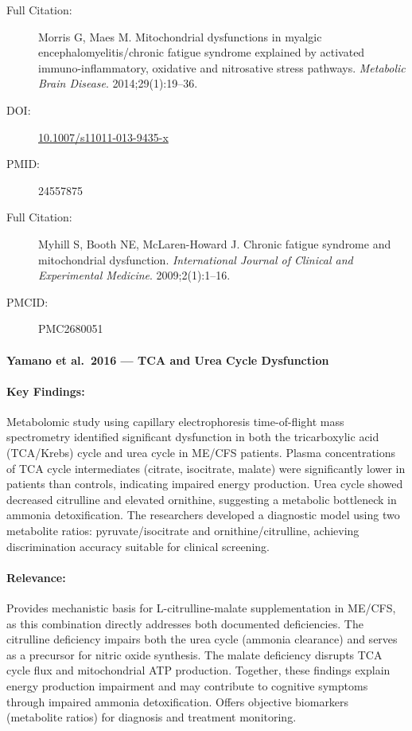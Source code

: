 \begin{description}
    \item[Full Citation:] Morris G, Maes M. Mitochondrial dysfunctions in myalgic encephalomyelitis/chronic fatigue syndrome explained by activated immuno-inflammatory, oxidative and nitrosative stress pathways. \textit{Metabolic Brain Disease}. 2014;29(1):19--36.
    \item[DOI:] \href{https://doi.org/10.1007/s11011-013-9435-x}{10.1007/s11011-013-9435-x}
    \item[PMID:] 24557875
\end{description}

\begin{description}
    \item[Full Citation:] Myhill S, Booth NE, McLaren-Howard J. Chronic fatigue syndrome and mitochondrial dysfunction. \textit{International Journal of Clinical and Experimental Medicine}. 2009;2(1):1--16.
    \item[PMCID:] PMC2680051
\end{description}

\paragraph{Yamano et al.\ 2016 --- TCA and Urea Cycle Dysfunction}

\cite{Yamano2016tca_urea}

\paragraph{Key Findings:}
Metabolomic study using capillary electrophoresis time-of-flight mass spectrometry identified significant dysfunction in both the tricarboxylic acid (TCA/Krebs) cycle and urea cycle in ME/CFS patients. Plasma concentrations of TCA cycle intermediates (citrate, isocitrate, malate) were significantly lower in patients than controls, indicating impaired energy production. Urea cycle showed decreased citrulline and elevated ornithine, suggesting a metabolic bottleneck in ammonia detoxification. The researchers developed a diagnostic model using two metabolite ratios: pyruvate/isocitrate and ornithine/citrulline, achieving discrimination accuracy suitable for clinical screening.

\paragraph{Relevance:}
Provides mechanistic basis for L-citrulline-malate supplementation in ME/CFS, as this combination directly addresses both documented deficiencies. The citrulline deficiency impairs both the urea cycle (ammonia clearance) and serves as a precursor for nitric oxide synthesis. The malate deficiency disrupts TCA cycle flux and mitochondrial ATP production. Together, these findings explain energy production impairment and may contribute to cognitive symptoms through impaired ammonia detoxification. Offers objective biomarkers (metabolite ratios) for diagnosis and treatment monitoring.


